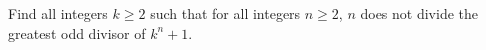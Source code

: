 Find all integers $k\ge 2$ such that for all integers $n\ge 2$,  $n$ does not divide the greatest odd divisor of $k^n+1$.